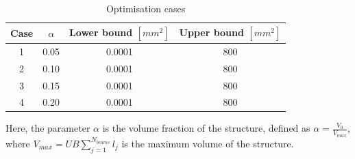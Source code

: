 \begin{table}[H]
    \centering
    \begin{tabular}{|c|c|c|c|}
        \hline
        \textbf{Case} & \textbf{$\alpha$} & \textbf{Lower bound $[mm^2]$} & \textbf{Upper bound $[mm^2]$} \\
        \hline
        1             & 0.05              & 0.0001                        & 800                           \\
        2             & 0.10              & 0.0001                        & 800                           \\
        3             & 0.15              & 0.0001                        & 800                           \\
        4             & 0.20              & 0.0001                        & 800                           \\
        \hline
    \end{tabular}
    \caption{Optimisation cases}
    \label{tab:cases}
\end{table}

Here, the parameter $\alpha$ is the volume fraction of the structure, defined as $\alpha = \frac{V_0}{V_{max}}$, where $V_{max} = UB \sum_{j=1}^{N_{beams}} l_j$ is the maximum volume of the structure.